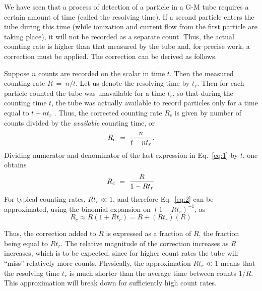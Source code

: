 We have seen that a process of detection of a particle in a G-M tube requires a
certain amount of time (called the resolving time). If a second particle enters
the tube during this time (while ionization and current flow from the first
particle are taking place), it will not be recorded as a separate count.  Thus,
the actual counting rate is higher than that measured by the tube and, for
precise work, a correction must be applied.  The correction can be derived as
follows.

Suppose $n$ counts are recorded on the scalar in time $t$.  Then the measured
counting rate $R~=~n/t$.  Let us denote the resolving time by $t_r$.  Then for
each particle counted the tube was unavailable for a time $t_r$, so that during
the counting time $t$, the tube was actually available to record particles only
for a time equal to $t - n t_r$ . Thus, the corrected counting rate $R_{c}$ is
given by number of counts divided by the {\em available} counting time, or
\begin{equation}
R_c ~=~ { n \over t - n t_r }.
\label{eq:1}
\end{equation}
Dividing numerator and denominator of the last expression in Eq.~\ref{eq:1} by
$t$, one obtains
\begin{equation}
R_c ~=~ { R \over 1 - R t_r }
\label{eq:2}
\end{equation}
For typical counting rates, $R t_{r} \ll 1$, and therefore Eq.~\ref{eq:2} can be approximated,
using the binomial expansion on $(1-R t_r)^{-1}$, as
\begin{equation}
R_{c} \approx R(1 + Rt_{r}) = R + (Rt_{r})(R)
\label{eq:3}
\end{equation}

Thus, the correction added to $R$ is expressed as a fraction of $R$, the
fraction being equal to $Rt_{r}$.  The relative
magnitude of the correction increases as $R$ increases, which is to be
expected, since for higher count rates the tube will
``miss'' relatively more counts.
Physically, the approximation
$Rt_{r} \ll 1$ means that the resolving
time $t_{r}$ is much shorter than the average time between
counts $1/R$.  This approximation will break down for sufficiently high
count rates.

